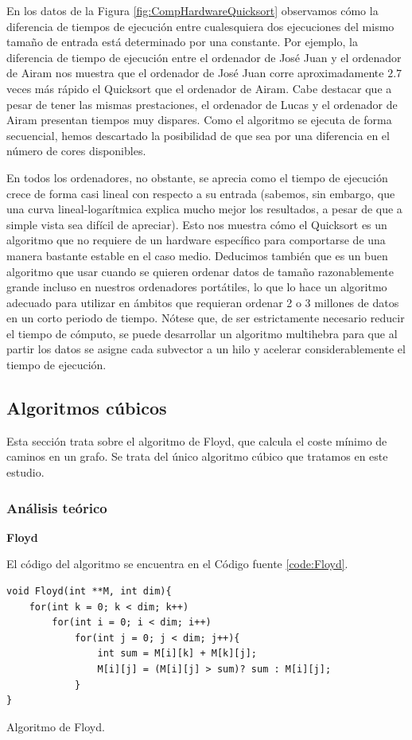 \documentclass[12pt]{article}
\begin{document}
    En los datos de la Figura \ref{fig:CompHardwareQuicksort} observamos cómo la diferencia de tiempos de ejecución entre cualesquiera dos ejecuciones del mismo tamaño de entrada está determinado por una constante. Por ejemplo, la diferencia de tiempo de ejecución entre el ordenador de José Juan y el ordenador de Airam nos muestra que el ordenador de José Juan corre aproximadamente $2.7$ veces más rápido el Quicksort que el ordenador de Airam. Cabe destacar que a pesar de tener las mismas prestaciones, el ordenador de Lucas y el ordenador de Airam presentan tiempos muy dispares. Como el algoritmo se ejecuta de forma secuencial, hemos descartado la posibilidad de que sea por una diferencia en el número de cores disponibles. 

    En todos los ordenadores, no obstante, se aprecia como el tiempo de ejecución crece de forma casi lineal con respecto a su entrada (sabemos, sin embargo, que una curva lineal-logarítmica explica mucho mejor los resultados, a pesar de que a simple vista sea difícil de apreciar). Esto nos muestra cómo el Quicksort es un algoritmo que no requiere de un hardware específico para comportarse de una manera bastante estable en el caso medio. Deducimos también que es un buen algoritmo que usar cuando se quieren ordenar datos de tamaño razonablemente grande incluso en nuestros ordenadores portátiles, lo que lo hace un algoritmo adecuado para utilizar en ámbitos que requieran ordenar 2 o 3 millones de datos en un corto periodo de tiempo. Nótese que, de ser estrictamente necesario reducir el tiempo de cómputo, se puede desarrollar un algoritmo multihebra para que al partir los datos se asigne cada subvector a un hilo y acelerar considerablemente el tiempo de ejecución.

    \subsection{Algoritmos cúbicos}
    Esta sección trata sobre el algoritmo de Floyd, que calcula el coste mínimo de caminos en un grafo. Se trata del único algoritmo cúbico que tratamos en este estudio.
    \subsubsection{Análisis teórico}
    \textbf{Floyd}
    
    El código del algoritmo se encuentra en el Código fuente \ref{code:Floyd}.
    \begin{listing}
        \begin{verbatim}
void Floyd(int **M, int dim){
    for(int k = 0; k < dim; k++)
        for(int i = 0; i < dim; i++)
            for(int j = 0; j < dim; j++){
                int sum = M[i][k] + M[k][j];
                M[i][j] = (M[i][j] > sum)? sum : M[i][j];
            }
}
        \end{verbatim}
        \caption{Algoritmo de Floyd.}
        \label{code:Floyd}
    \end{listing}
    
\end{document}
